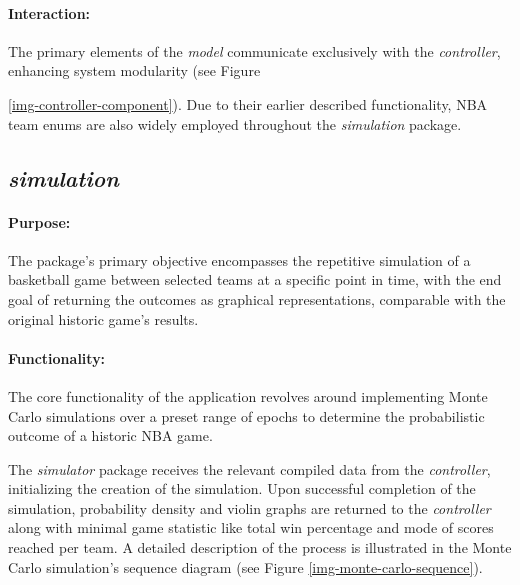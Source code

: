 \documentclass{thesis-ekf}
\theoremstyle{definition}
\theoremstyle{remark}
\begin{document}
\paragraph{Interaction:}
The primary elements of the \emph{model} communicate exclusively with the \emph{controller}, enhancing system modularity (see Figure {\ref{img-controller-component}). Due to their earlier described functionality, NBA team enums are also widely employed throughout the \emph{simulation} package. 

\subsection{\emph{simulation}}
\paragraph{Purpose:}
The package's primary objective encompasses the repetitive simulation of a basketball game between selected teams at a specific point in time, with the end goal of returning the outcomes as graphical representations, comparable with the original historic game's results.
\paragraph{Functionality:}
The core functionality of the application revolves around implementing Monte Carlo simulations over a preset range of epochs to determine the probabilistic outcome of a historic NBA game. 

The \emph{simulator} package receives the relevant compiled data from the \emph{controller}, initializing the creation of the simulation. Upon successful completion of the simulation, probability density and violin graphs are returned to the \emph{controller} along with minimal game statistic like total win percentage and mode of scores reached per team. A detailed description of the process is illustrated in the Monte Carlo simulation's sequence diagram (see Figure {\ref{img-monte-carlo-sequence}}).
}
\end{document}
